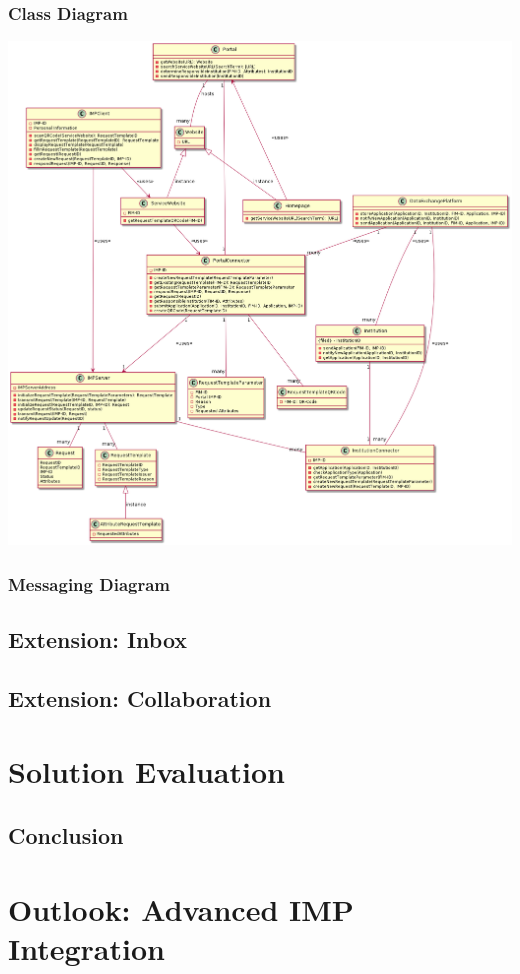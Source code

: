 \documentclass[
     12pt,         %
     a4paper,      %
     BCOR=10mm,version=first,     %
     DIV=14,version=first,        %
     ]{scrreprt}
\begin{document}
\subsection{Class Diagram}

\includegraphics[width=15cm]{Class Diagram.png}

\subsection{Messaging Diagram}

\section{Extension: Inbox}

\section{Extension: Collaboration}

\chapter{Solution Evaluation}

\section{Conclusion}

\chapter{Outlook: Advanced IMP Integration}

\printbibliography
\end{document}
